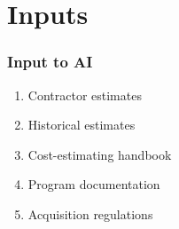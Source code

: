 % 

\section{Inputs}
\begin{frame}\frametitle{Input to AI}
	\begin{enumerate}
		\item Contractor estimates
		\item Historical estimates
		\item Cost-estimating handbook
		\item Program documentation
		\item Acquisition regulations
	\end{enumerate}
\end{frame}

\endinput  %

\subsection{A}
\begin{frame}\frametitle{Title}
\center
	Slide content
\end{frame}

\subsection{B}
\begin{frame}\frametitle{Title}
\center
	Slide content
\end{frame}

\endinput  %
